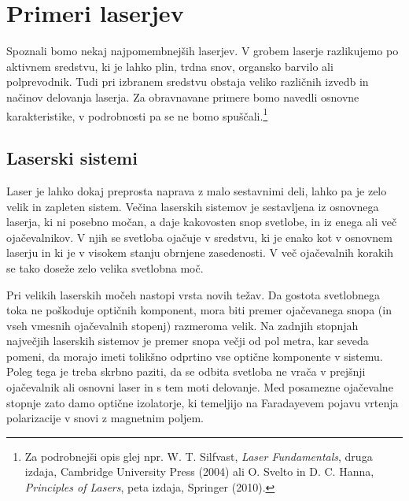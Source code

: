 
\chapter{Primeri laserjev}
\label{chap:Primeri}
Spoznali bomo nekaj najpomembnejših laserjev.
V grobem laserje razlikujemo po aktivnem sredstvu, ki je lahko plin, trdna snov, 
organsko barvilo ali polprevodnik. Tudi pri izbranem
sredstvu obstaja veliko različnih izvedb in načinov delovanja laserja. Za 
obravnavane primere bomo navedli osnovne karakteristike, v podrobnosti pa se
ne bomo spuščali.\footnote{Za podrobnejši opis glej npr. W. T. Silfvast,
{\it Laser Fundamentals}, druga izdaja, Cambridge University Press (2004) ali
O. Svelto in D. C. Hanna, {\it Principles of Lasers}, peta izdaja, Springer (2010).}

\section{Laserski sistemi}
Laser  je lahko dokaj preprosta naprava z malo sestavnimi deli,
lahko pa je zelo velik in zapleten sistem. Večina laserskih sistemov
je sestavljena iz osnovnega laserja, ki ni posebno močan, a daje kakovosten
snop svetlobe, in iz enega ali več ojačevalnikov. V njih se svetloba 
ojačuje v sredstvu, ki je enako kot v osnovnem laserju in ki je v visokem stanju obrnjene zasedenosti. V več ojačevalnih korakih 
se tako doseže zelo velika svetlobna moč. 

Pri velikih laserskih močeh nastopi vrsta novih težav. Da gostota 
svetlobnega toka ne poškoduje optičnih komponent, mora biti
premer ojačevanega snopa (in vseh vmesnih ojačevalnih stopenj) razmeroma velik. 
Na zadnjih stopnjah največjih laserskih sistemov je 
premer snopa večji od pol metra, kar seveda pomeni, da morajo imeti tolikšno odprtino 
vse optične komponente v sistemu. Poleg tega je
treba skrbno paziti, da se odbita svetloba ne vrača v prejšnji
ojačevalnik ali osnovni laser in s tem moti delovanje. Med
posamezne ojačevalne stopnje zato damo optične izolatorje, ki temeljijo na Faradayevem
pojavu vrtenja polarizacije v snovi z magnetnim poljem.

